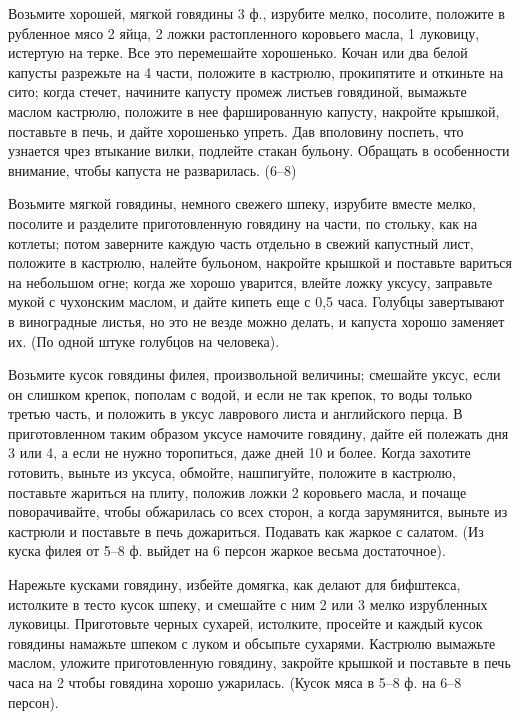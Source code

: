 
Возьмите хорошей, мягкой говядины 3 ф., изрубите мелко, посолите, положите в рубленное мясо 2 яйца, 2 ложки растопленного коровьего масла, 1 луковицу, истертую на терке. Все это перемешайте хорошенько. Кочан или два белой капусты разрежьте на 4 части, положите в кастрюлю, прокипятите и откиньте на сито; когда стечет, начините капусту промеж листьев говядиной, вымажьте маслом кастрюлю, положите в нее фаршированную капусту, накройте крышкой, поставьте в печь, и дайте хорошенько упреть. Дав вполовину поспеть, что узнается чрез втыкание вилки, подлейте стакан бульону. Обращать в особенности внимание, чтобы капуста не разварилась. (6--8) 


Возьмите мягкой говядины, немного свежего шпеку, изрубите вместе мелко, посолите и разделите приготовленную говядину на части, по стольку, как на котлеты; потом заверните каждую часть отдельно в свежий капустный лист, положите в кастрюлю, налейте бульоном, накройте крышкой и поставьте вариться на небольшом огне; когда же хорошо уварится, влейте ложку уксусу, заправьте мукой с чухонским маслом, и дайте кипеть еще с 0,5 часа. Голубцы завертывают в виноградные листья, но это не везде можно делать, и капуста хорошо заменяет их. (По одной штуке голубцов на человека). 


Возьмите кусок говядины филея, произвольной величины; смешайте уксус, если он слишком крепок, пополам с водой, и если не так крепок, то воды только третью часть, и положить в уксус лаврового листа и английского перца. В приготовленном таким образом уксусе намочите говядину, дайте ей полежать дня 3 или 4, а если не нужно торопиться, даже дней 10 и более. Когда захотите готовить, выньте из уксуса, обмойте, нашпигуйте, положите в кастрюлю, поставьте жариться на плиту, положив ложки 2 коровьего масла, и почаще поворачивайте, чтобы обжарилась со всех сторон, а когда зарумянится, выньте из кастрюли и поставьте в печь дожариться. Подавать как жаркое с салатом. (Из куска филея от 5--8 ф. выйдет на 6 персон жаркое весьма достаточное). 


Нарежьте кусками говядину, избейте домягка, как делают для бифштекса, истолките в тесто кусок шпеку, и смешайте с ним 2 или 3 мелко изрубленных луковицы. Приготовьте черных сухарей, истолките, просейте и каждый кусок говядины намажьте шпеком с луком и обсыпьте сухарями. Кастрюлю вымажьте маслом, уложите приготовленную говядину, закройте крышкой и поставьте в печь часа на 2 чтобы говядина хорошо ужарилась. (Кусок мяса в 5--8 ф. на 6--8 персон). 

